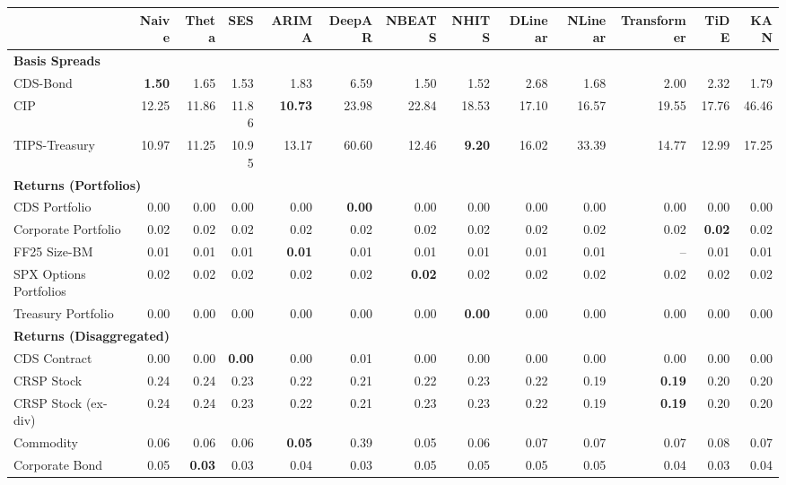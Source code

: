 \scriptsize
\setlength{\tabcolsep}{1.5pt}
\renewcommand{\arraystretch}{0.9}
\begin{tabular}{@{}lrrrrrrrrrrrr@{}}
\toprule
 & Naive & Theta & SES & ARIMA & DeepAR & NBEATS & NHITS & DLinear & NLinear & Transformer & TiDE & KAN \\
\midrule
\multicolumn{13}{l}{\textbf{Basis Spreads}} \\
CDS-Bond & \textbf{1.50} & 1.65 & 1.53 & 1.83 & 6.59 & 1.50 & 1.52 & 2.68 & 1.68 & 2.00 & 2.32 & 1.79 \\
CIP & 12.25 & 11.86 & 11.86 & \textbf{10.73} & 23.98 & 22.84 & 18.53 & 17.10 & 16.57 & 19.55 & 17.76 & 46.46 \\
TIPS-Treasury & 10.97 & 11.25 & 10.95 & 13.17 & 60.60 & 12.46 & \textbf{9.20} & 16.02 & 33.39 & 14.77 & 12.99 & 17.25 \\
\midrule
\multicolumn{13}{l}{\textbf{Returns (Portfolios)}} \\
CDS Portfolio & 0.00 & 0.00 & 0.00 & 0.00 & \textbf{0.00} & 0.00 & 0.00 & 0.00 & 0.00 & 0.00 & 0.00 & 0.00 \\
Corporate Portfolio & 0.02 & 0.02 & 0.02 & 0.02 & 0.02 & 0.02 & 0.02 & 0.02 & 0.02 & 0.02 & \textbf{0.02} & 0.02 \\
FF25 Size-BM & 0.01 & 0.01 & 0.01 & \textbf{0.01} & 0.01 & 0.01 & 0.01 & 0.01 & 0.01 & -- & 0.01 & 0.01 \\
SPX Options Portfolios & 0.02 & 0.02 & 0.02 & 0.02 & 0.02 & \textbf{0.02} & 0.02 & 0.02 & 0.02 & 0.02 & 0.02 & 0.02 \\
Treasury Portfolio & 0.00 & 0.00 & 0.00 & 0.00 & 0.00 & 0.00 & \textbf{0.00} & 0.00 & 0.00 & 0.00 & 0.00 & 0.00 \\
\midrule
\multicolumn{13}{l}{\textbf{Returns (Disaggregated)}} \\
CDS Contract & 0.00 & 0.00 & \textbf{0.00} & 0.00 & 0.01 & 0.00 & 0.00 & 0.00 & 0.00 & 0.00 & 0.00 & 0.00 \\
CRSP Stock & 0.24 & 0.24 & 0.23 & 0.22 & 0.21 & 0.22 & 0.23 & 0.22 & 0.19 & \textbf{0.19} & 0.20 & 0.20 \\
CRSP Stock (ex-div) & 0.24 & 0.24 & 0.23 & 0.22 & 0.21 & 0.23 & 0.23 & 0.22 & 0.19 & \textbf{0.19} & 0.20 & 0.20 \\
Commodity & 0.06 & 0.06 & 0.06 & \textbf{0.05} & 0.39 & 0.05 & 0.06 & 0.07 & 0.07 & 0.07 & 0.08 & 0.07 \\
Corporate Bond & 0.05 & \textbf{0.03} & 0.03 & 0.04 & 0.03 & 0.05 & 0.05 & 0.05 & 0.05 & 0.04 & 0.03 & 0.04 \\

\end{tabular}
